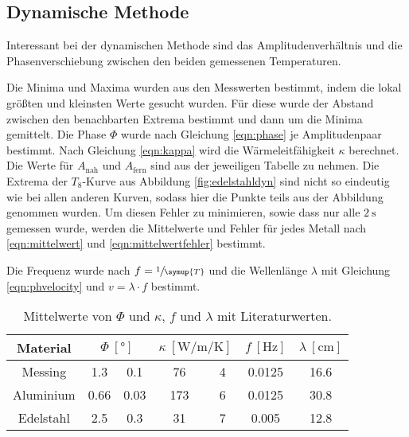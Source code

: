 \newpage

\subsection{Dynamische Methode}
\label{sec:dynamisch}
Interessant bei der dynamischen Methode sind das Amplitudenverhältnis und die
Phasenverschiebung zwischen den beiden gemessenen Temperaturen.

Die Minima und Maxima wurden aus den Messwerten bestimmt, indem die lokal größten
und kleinsten Werte gesucht wurden.
Für diese wurde der Abstand zwischen den benachbarten Extrema bestimmt und dann
um die Minima gemittelt.
Die Phase $Φ$ wurde nach Gleichung \ref{eqn:phase} je Amplitudenpaar bestimmt.
Nach Gleichung \ref{eqn:kappa} wird die Wärmeleitfähigkeit $κ$ berechnet.
Die Werte für $A_\text{nah}$ und $A_\text{fern}$ sind aus der jeweiligen Tabelle
zu nehmen.
Die Extrema der $T_8$-Kurve aus Abbildung \ref{fig:edelstahldyn} sind nicht so
eindeutig wie bei allen anderen Kurven, sodass hier die Punkte teils aus der
Abbildung genommen wurden. Um diesen Fehler zu minimieren, sowie dass nur alle
$\SI{2}{\second}$ gemessen wurde, werden die Mittelwerte und Fehler für jedes Metall
nach \ref{eqn:mittelwert} und \ref{eqn:mittelwertfehler} bestimmt.

Die Frequenz wurde nach $f = \sfrac{1}{\symup{T}}$ und die Wellenlänge $λ$ mit
Gleichung \eqref{eqn:phvelocity} und $v = λ\cdot f$ bestimmt.
\begin{table}
      \centering
      \caption{Mittelwerte von $Φ$ und $κ$, $f$ und $λ$ mit Literaturwerten.}
      \label{tab:phiundkappa}
      \begin{tabular}{c S[table-format=1.2] @{${}\pm{}$} S[table-format=1.2]
                  S[table-format=3.1] @{${}\pm{}$} S[table-format=1.2]
                  S[table-format=1.4] S[table-format=2.1]}
                  \toprule
                  {Material}
                  & 
                  & 
                  & {$f\:[\si{\hertz}]$}
                  & {$λ\:[\si{\centi\metre}]$} \\
                  \midrule
                  Messing   & 1.3  & 0.1  &  76 & 4 & 0.0125 & 16.6 \\
                  Aluminium & 0.66 & 0.03 & 173 & 6 & 0.0125 & 30.8 \\
                  Edelstahl & 2.5  & 0.3  &  31 & 7 & 0.005  & 12.8 \\
                  \bottomrule
      \end{tabular}
\end{table}

